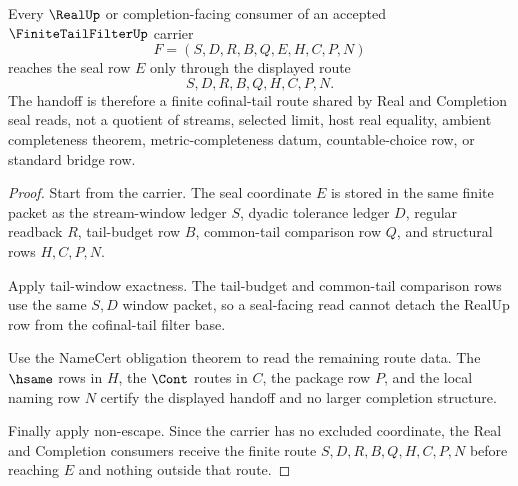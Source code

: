 \begin{theorem}
\label{thm:finite-tail-filter-real-seal-handoff}
Every $\RealUp$ or completion-facing consumer of an accepted $\FiniteTailFilterUp$ carrier
$$
F=(S,D,R,B,Q,E,H,C,P,N)
$$
reaches the seal row $E$ only through the displayed route
$$
S,D,R,B,Q,H,C,P,N.
$$
The handoff is therefore a finite cofinal-tail route shared by Real and Completion seal reads, not a quotient of streams, selected limit, host real equality, ambient completeness theorem, metric-completeness datum, countable-choice row, or standard bridge row.
\end{theorem}
\begin{proof}
Start from the carrier. The seal coordinate $E$ is stored in the same finite packet as the stream-window ledger $S$, dyadic tolerance ledger $D$, regular readback $R$, tail-budget row $B$, common-tail comparison row $Q$, and structural rows $H,C,P,N$.

Apply tail-window exactness. The tail-budget and common-tail comparison rows use the same $S,D$ window packet, so a seal-facing read cannot detach the RealUp row from the cofinal-tail filter base.

Use the NameCert obligation theorem to read the remaining route data. The $\hsame$ rows in $H$, the $\Cont$ routes in $C$, the package row $P$, and the local naming row $N$ certify the displayed handoff and no larger completion structure.

Finally apply non-escape. Since the carrier has no excluded coordinate, the Real and Completion consumers receive the finite route $S,D,R,B,Q,H,C,P,N$ before reaching $E$ and nothing outside that route.
\end{proof}


